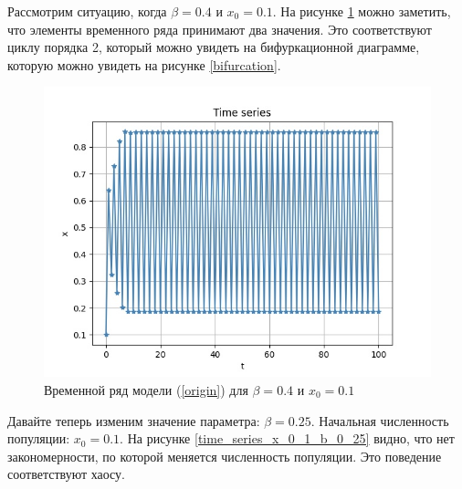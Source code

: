     Рассмотрим ситуацию, когда \(\beta = 0.4\) и \(x_0 = 0.1\). На рисунке \ref{time_series_x_0_1_b_0_4} можно заметить, что элементы временного ряда принимают два значения. Это соответствуют циклу порядка 2, который можно увидеть на бифуркационной диаграмме, которую можно увидеть на рисунке \ref{bifurcation}.
    
    \begin{figure}
        \centering
        \includegraphics[width=\textwidth]{deterministic/images/time_series_x_0_1_b_0_4.jpeg}

        \captionsetup{justification=centering}
        \caption{Временной ряд модели (\ref{origin}) для \(\beta = 0.4\) и \(x_0 = 0.1\)}
        \label{time_series_x_0_1_b_0_4}
    \end{figure}

    Давайте теперь изменим значение параметра: \(\beta = 0.25\). Начальная численность популяции: \(x_0 = 0.1\). На рисунке \ref{time_series_x_0_1_b_0_25} видно, что нет закономерности, по которой меняется численность популяции. Это поведение соответствуют хаосу.
    
